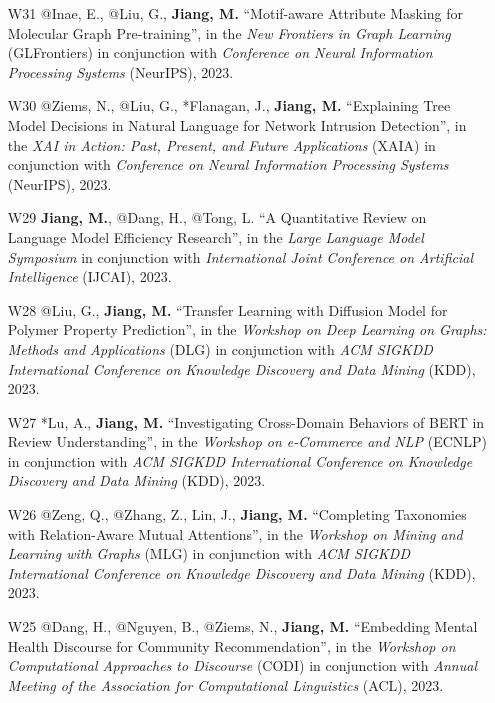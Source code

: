 \documentclass[10pt]{article}
\newenvironment{myindentpar}[1]%
{\begin{list}{}%
         {\setlength{\leftmargin}{#1}}%
         \item[]%
}
{\end{list}}
\newcounter{list}
\begin{document}
\begin{myindentpar}{0.00cm}
\begin{enumerate}[leftmargin=.5cm]
\item[W31] @Inae, E., @Liu, G., \textbf{Jiang, M.} ``Motif-aware Attribute Masking for Molecular Graph Pre-training'', in the \textit{New Frontiers in Graph Learning} (GLFrontiers) in conjunction with \textit{Conference on Neural Information Processing Systems} (NeurIPS), 2023.

\item[W30] @Ziems, N., @Liu, G., *Flanagan, J., \textbf{Jiang, M.} ``Explaining Tree Model Decisions in Natural Language for Network Intrusion Detection'', in the \textit{XAI in Action: Past, Present, and Future Applications} (XAIA) in conjunction with \textit{Conference on Neural Information Processing Systems} (NeurIPS), 2023.

\item[W29] \textbf{Jiang, M.}, @Dang, H., @Tong, L. ``A Quantitative Review on Language Model Efficiency Research'', in the \textit{Large Language Model Symposium} in conjunction with \textit{International Joint Conference on Artificial Intelligence} (IJCAI), 2023.

\item[W28] @Liu, G., \textbf{Jiang, M.} ``Transfer Learning with Diffusion Model for Polymer Property Prediction'', in the \textit{Workshop on Deep Learning on Graphs: Methods and Applications} (DLG) in conjunction with \textit{ACM SIGKDD International Conference on Knowledge Discovery and Data Mining} (KDD), 2023.

\item[W27] *Lu, A., \textbf{Jiang, M.} ``Investigating Cross-Domain Behaviors of BERT in Review Understanding'', in the \textit{Workshop on e-Commerce and NLP} (ECNLP) in conjunction with \textit{ACM SIGKDD International Conference on Knowledge Discovery and Data Mining} (KDD), 2023.

\item[W26] @Zeng, Q., @Zhang, Z., Lin, J., \textbf{Jiang, M.} ``Completing Taxonomies with Relation-Aware Mutual Attentions'', in the \textit{Workshop on Mining and Learning with Graphs} (MLG) in conjunction with \textit{ACM SIGKDD International Conference on Knowledge Discovery and Data Mining} (KDD), 2023.

\item[W25] @Dang, H., @Nguyen, B., @Ziems, N., \textbf{Jiang, M.} ``Embedding Mental Health Discourse for Community Recommendation'', in the \textit{Workshop on Computational Approaches to Discourse} (CODI) in conjunction with \textit{Annual Meeting of the Association for Computational Linguistics} (ACL), 2023.


\end{enumerate}
\end{myindentpar}
\end{document}
